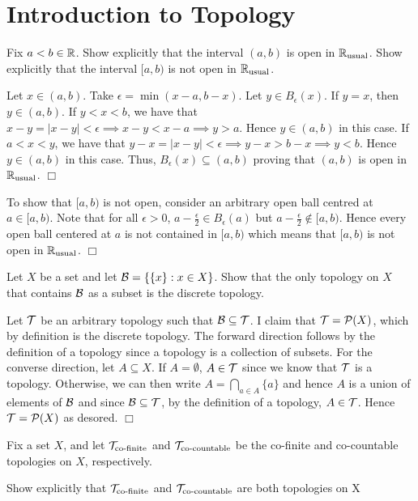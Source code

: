 \documentclass{article}
\begin{document}
\tableofcontents
\newpage
\section{Introduction to Topology}
\begin{spacedenumerate}
    
    \item Fix $a < b \in \mathbb{R}$. Show explicitly that the interval $(a, b)$ is open in $\mathbb{R}_{\text{usual}}$. Show explicitly that the interval $[a, b)$ is not open in $\mathbb{R}_{\text{usual}}$.
    
    Let $x\in (a,b)$. Take $\epsilon = \min(x-a, b-x)$. Let $y\in B_{\epsilon}(x)$. If $y = x$, then $y \in (a,b)$. If $y < x < b$, we have that $x - y  = \lvert x -y \rvert < \epsilon \implies x-y < x-a \implies y > a$. Hence $y\in (a,b)$ in this case. If $a < x < y$, we have that $y - x  = \lvert x -y \rvert < \epsilon \implies y-x > b-x \implies y < b$. Hence $y \in (a,b)$ in this case. Thus, $B_{\epsilon}(x)\subseteq (a,b)$ proving that $(a,b)$ is open in $\mathbb{R}_{\text{usual}}$. $\Box$

    To show that $[a,b)$ is not open, consider an arbitrary open ball centred at $a\in [a,b)$. Note that for all $\epsilon > 0$, $a - \frac{\epsilon}{2}\in B_{\epsilon}(a)$ but $a - \frac{\epsilon}{2} \not\in [a,b)$. Hence every open ball centered at $a$ is not contained in $[a,b)$ which means that $[a,b)$ is not open in $\mathbb{R}_{\text{usual}}$. $\Box$
    \item Let $X$ be a set and let $\mathcal{B} = \{ \{x\} : x \in X \}$. Show that the only topology on $X$ that contains $\mathcal{B}$ as a subset is the discrete topology.
    
    Let $\mathcal{T}$ be an arbitrary topology such that $\mathcal{B}\subseteq \mathcal{T}$. I claim that $\mathcal{T} = \mathcal{P}(X)$, which by definition is the discrete topology. The forward direction follows by the definition of a topology since a topology is a collection of subsets. For the converse direction, let $A\subseteq X$. If $A = \emptyset$, $A\in \mathcal{T}$ since we know that $\mathcal{T}$ is a topology. Otherwise, we can then write $A = \bigcap_{a\in A}\{a\}$ and hence $A$ is a union of elements of $\mathcal{B}$ and since $\mathcal{B}\subseteq \mathcal{T}$, by the definition of a topology, $A\in \mathcal{T}$. Hence $\mathcal{T} = \mathcal{P}(X)$ as desored. $\Box$

    \item Fix a set $X$, and let $\mathcal{T}_{\text{co-finite}}$ and $\mathcal{T}_{\text{co-countable}}$ be the co-finite and co-countable topologies on $X$, respectively.
    \begin{spacedenumerate}
        
        \item Show explicitly that $\mathcal{T}_{\text{co-finite}}$ and $\mathcal{T}_{\text{co-countable}}$ are both topologies on X
        

\end{spacedenumerate}
\end{spacedenumerate}
\end{document}
